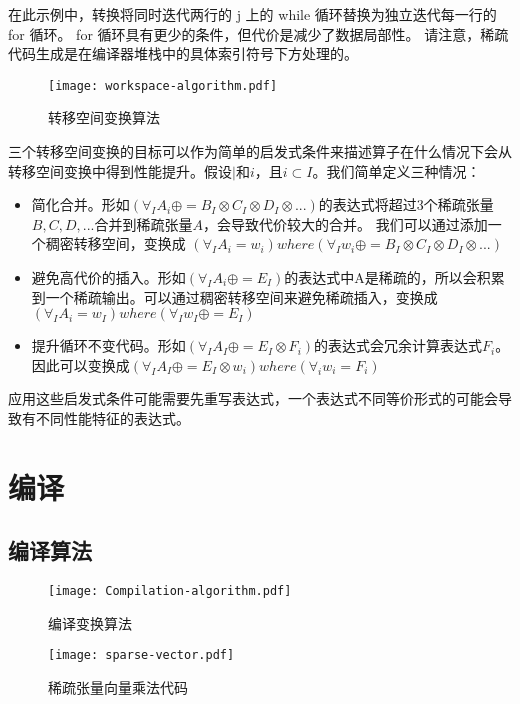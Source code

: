 \begin{translation}
在此示例中，转换将同时迭代两行的 j 上的 while 循环替换为独立迭代每一行的 for 循环。 for 循环具有更少的条件，但代价是减少了数据局部性。 
请注意，稀疏代码生成是在编译器堆栈中的具体索引符号下方处理的。
\begin{figure}
  \centering
  \texttt{[image: workspace-algorithm.pdf]}
  \caption{转移空间变换算法}
  \label{fig:workspace-transformation}
\end{figure}
三个转移空间变换的目标可以作为简单的启发式条件来描述算子在什么情况下会从转移空间变换中得到性能提升。假设$|$和$i$，且$i\subset I$。我们简单定义三种情况：
\begin{itemize}
  \item 简化合并。形如$(\forall_I A_i \oplus= B_I \otimes C_I \otimes D_I \otimes ...)$的表达式将超过3个稀疏张量$B,C,D,...$合并到稀疏张量$A$，会导致代价较大的合并。
  我们可以通过添加一个稠密转移空间，变换成 $(\forall_I A_i=w_i) where (\forall_I w_i \oplus= B_I \otimes C_I \otimes D_I \otimes ...)$ 
  \item 避免高代价的插入。形如$(\forall_I A_i \oplus= E_I)$的表达式中A是稀疏的，所以会积累到一个稀疏输出。可以通过稠密转移空间来避免稀疏插入，变换成$(\forall_I A_i = w_I) where (\forall_I w_I\oplus= E_I)$
  \item 提升循环不变代码。形如$(\forall_I A_I \oplus= E_I \otimes F_i)$的表达式会冗余计算表达式$F_i$。因此可以变换成$(\forall_I A_I \oplus= E_I \otimes w_i) where (\forall_i w_i = F_i)$
 \end{itemize} 
应用这些启发式条件可能需要先重写表达式，一个表达式不同等价形式的可能会导致有不同性能特征的表达式。

\section{编译}
\subsection{编译算法}
\begin{figure}
  \centering
  \texttt{[image: Compilation-algorithm.pdf]}
  \caption{编译变换算法}
  \label{fig:Compilation-transformation}
\end{figure}

\begin{figure}
  \centering
  \texttt{[image: sparse-vector.pdf]}
  \caption{稀疏张量向量乘法代码}
  \label{fig:Sparse-vector}
\end{figure}


\end{translation}
